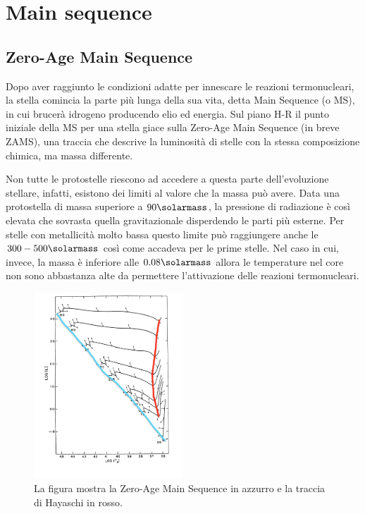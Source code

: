 \section{Main sequence}\label{sec:main-sequence}
\subsection{Zero-Age Main Sequence}
Dopo aver raggiunto le condizioni adatte per innescare le reazioni termonucleari, la stella comincia la parte più lunga della sua vita, detta Main Sequence (o MS), in cui brucerà idrogeno producendo elio ed energia. Sul piano H-R il punto iniziale della MS per una stella giace sulla Zero-Age Main Sequence (in breve ZAMS), una traccia che descrive la luminosità di stelle con la stessa composizione chimica, ma massa differente.

Non tutte le protostelle riescono ad accedere a questa parte dell'evoluzione stellare, infatti, esistono dei limiti al valore che la massa può avere. Data una protostella di massa superiore a $90 \si{\solarmass}$, la pressione di radiazione è così elevata che sovrasta quella gravitazionale disperdendo le parti più esterne. Per stelle con metallicità molto bassa questo limite può raggiungere anche le $300 - 500 \si{\solarmass}$ così come accadeva per le prime stelle. Nel caso in cui, invece, la massa è inferiore alle $0.08 \si{\solarmass}$ allora le temperature nel core non sono abbastanza alte da permettere l'attivazione delle reazioni termonucleari.

\begin{figure}
    \centering
    \includegraphics[width = 0.5\textwidth]{immagini/ZAMS.png}
    \caption{La figura mostra la Zero-Age Main Sequence in azzurro e la traccia di Hayaschi in rosso.}\label{fig:ZAMS}
\end{figure}

